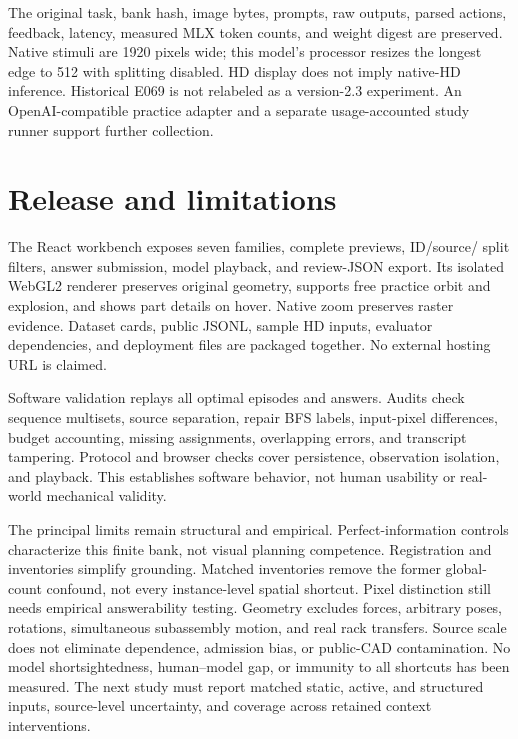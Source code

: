 \documentclass[10pt,twocolumn,letterpaper]{article}
\begin{document}
The original task, bank hash, image bytes, prompts, raw outputs, parsed
actions, feedback, latency, measured MLX token counts, and weight digest
are preserved. Native stimuli are 1920 pixels wide; this model's processor
resizes the longest edge to 512 with splitting disabled. HD display does
not imply native-HD inference. Historical E069 is not relabeled as a
version-2.3 experiment. An OpenAI-compatible practice adapter and a
separate usage-accounted study runner support further collection.

\section{Release and limitations}
The React workbench exposes seven families, complete previews, ID/source/
split filters, answer submission, model playback, and review-JSON export.
Its isolated WebGL2 renderer preserves original geometry, supports free
practice orbit and explosion, and shows part details on hover.
Native zoom preserves raster evidence. Dataset cards, public JSONL,
sample HD inputs, evaluator dependencies, and deployment files are
packaged together. No external hosting URL is claimed.

Software validation replays all \EpisodeCount{} optimal episodes and
\ProbeCount{} answers. Audits check sequence multisets, source separation,
repair BFS labels, input-pixel differences, budget accounting, missing
assignments, overlapping errors, and transcript tampering. Protocol and
browser checks cover persistence, observation isolation, and playback.
This establishes software behavior, not human usability or real-world
mechanical validity.

The principal limits remain structural and empirical. Perfect-information
controls characterize this finite bank, not visual planning competence.
Registration and inventories simplify grounding. Matched inventories remove
the former global-count confound, not every instance-level spatial shortcut.
Pixel distinction still needs empirical answerability testing.
Geometry excludes forces, arbitrary poses, rotations,
simultaneous subassembly motion, and real rack transfers. Source scale
does not eliminate dependence, admission bias, or public-CAD contamination.
No model shortsightedness,
human--model gap, or immunity to all shortcuts has been measured.
The next study must report matched static, active, and structured inputs,
source-level uncertainty, and coverage across retained context interventions.

\newpage
{\small


}
\end{document}
